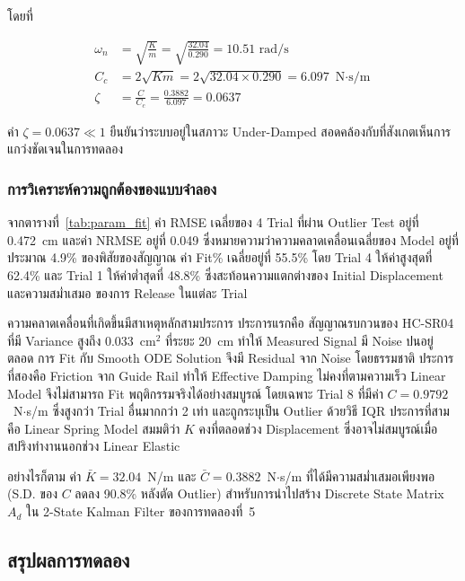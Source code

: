 โดยที่

\begin{align}
    \omega_n &= \sqrt{\frac{K}{m}} = \sqrt{\frac{32.04}{0.290}}
               = 10.51 \text{ rad/s}
               \label{eq:omega_n_calc} \\[4pt]
    C_c      &= 2\sqrt{Km} = 2\sqrt{32.04 \times 0.290}
               = 6.097 \text{ N$\cdot$s/m}
               \label{eq:cc_calc} \\[4pt]
    \zeta    &= \frac{C}{C_c} = \frac{0.3882}{6.097}
               = 0.0637
               \label{eq:zeta_calc}
\end{align}

ค่า $\zeta = 0.0637 \ll 1$ ยืนยันว่าระบบอยู่ในสภาวะ Under-Damped
สอดคล้องกับที่สังเกตเห็นการแกว่งชัดเจนในการทดลอง

\subsubsection{การวิเคราะห์ความถูกต้องของแบบจำลอง}

จากตารางที่~\ref{tab:param_fit} ค่า RMSE เฉลี่ยของ 4 Trial ที่ผ่าน
Outlier Test อยู่ที่ 0.472~cm และค่า NRMSE อยู่ที่ 0.049
ซึ่งหมายความว่าความคลาดเคลื่อนเฉลี่ยของ Model อยู่ที่ประมาณ 4.9\%
ของพิสัยของสัญญาณ ค่า Fit\% เฉลี่ยอยู่ที่ 55.5\% โดย Trial 4
ให้ค่าสูงสุดที่ 62.4\% และ Trial 1 ให้ค่าต่ำสุดที่ 48.8\%
ซึ่งสะท้อนความแตกต่างของ Initial Displacement และความสม่ำเสมอ
ของการ Release ในแต่ละ Trial

ความคลาดเคลื่อนที่เกิดขึ้นมีสาเหตุหลักสามประการ ประการแรกคือ
สัญญาณรบกวนของ HC-SR04 ที่มี Variance สูงถึง 0.033~cm$^2$
ที่ระยะ 20~cm ทำให้ Measured Signal มี Noise ปนอยู่ตลอด
การ Fit กับ Smooth ODE Solution จึงมี Residual จาก Noise
โดยธรรมชาติ ประการที่สองคือ Friction จาก Guide Rail
ทำให้ Effective Damping ไม่คงที่ตามความเร็ว
Linear Model จึงไม่สามารถ Fit พฤติกรรมจริงได้อย่างสมบูรณ์
โดยเฉพาะ Trial 8 ที่มีค่า $C = 0.9792$~N$\cdot$s/m
ซึ่งสูงกว่า Trial อื่นมากกว่า 2 เท่า และถูกระบุเป็น Outlier
ด้วยวิธี IQR ประการที่สามคือ Linear Spring Model
สมมติว่า $K$ คงที่ตลอดช่วง Displacement
ซึ่งอาจไม่สมบูรณ์เมื่อสปริงทำงานนอกช่วง Linear Elastic

อย่างไรก็ตาม ค่า $\bar{K} = 32.04$~N/m และ
$\bar{C} = 0.3882$~N$\cdot$s/m ที่ได้มีความสม่ำเสมอเพียงพอ
(S.D. ของ $C$ ลดลง 90.8\% หลังตัด Outlier)
สำหรับการนำไปสร้าง Discrete State Matrix $A_d$
ใน 2-State Kalman Filter ของการทดลองที่~5

\subsection{สรุปผลการทดลอง}

